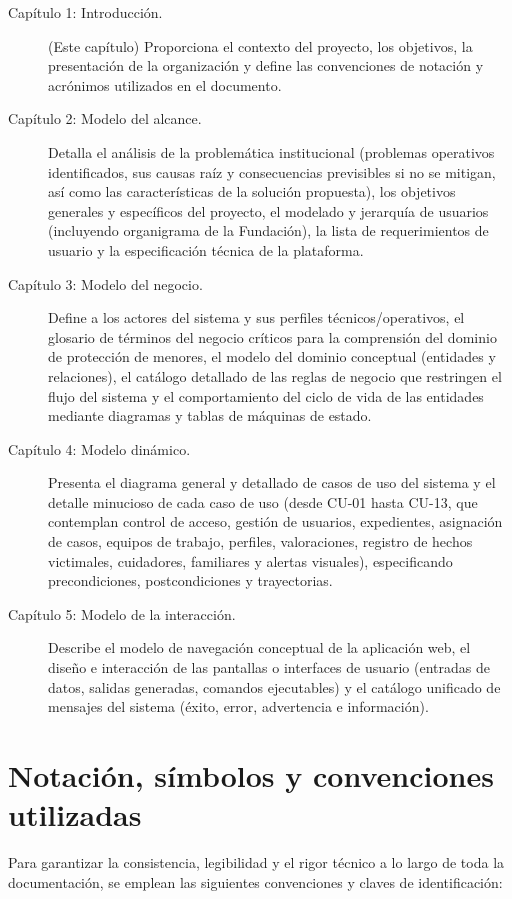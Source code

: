 \begin{description}
	\item[Capítulo 1: Introducción.] (Este capítulo) Proporciona el contexto del proyecto, los objetivos, la presentación de la organización y define las convenciones de notación y acrónimos utilizados en el documento.
	\item[Capítulo 2: Modelo del alcance.] Detalla el análisis de la problemática institucional (problemas operativos identificados, sus causas raíz y consecuencias previsibles si no se mitigan, así como las características de la solución propuesta), los objetivos generales y específicos del proyecto, el modelado y jerarquía de usuarios (incluyendo organigrama de la Fundación), la lista de requerimientos de usuario y la especificación técnica de la plataforma.
	\item[Capítulo 3: Modelo del negocio.] Define a los actores del sistema y sus perfiles técnicos/operativos, el glosario de términos del negocio críticos para la comprensión del dominio de protección de menores, el modelo del dominio conceptual (entidades y relaciones), el catálogo detallado de las reglas de negocio que restringen el flujo del sistema y el comportamiento del ciclo de vida de las entidades mediante diagramas y tablas de máquinas de estado.
	\item[Capítulo 4: Modelo dinámico.] Presenta el diagrama general y detallado de casos de uso del sistema y el detalle minucioso de cada caso de uso (desde CU-01 hasta CU-13, que contemplan control de acceso, gestión de usuarios, expedientes, asignación de casos, equipos de trabajo, perfiles, valoraciones, registro de hechos victimales, cuidadores, familiares y alertas visuales), especificando precondiciones, postcondiciones y trayectorias.
	\item[Capítulo 5: Modelo de la interacción.] Describe el modelo de navegación conceptual de la aplicación web, el diseño e interacción de las pantallas o interfaces de usuario (entradas de datos, salidas generadas, comandos ejecutables) y el catálogo unificado de mensajes del sistema (éxito, error, advertencia e información).
\end{description}

\section{Notación, símbolos y convenciones utilizadas}

Para garantizar la consistencia, legibilidad y el rigor técnico a lo largo de toda la documentación, se emplean las siguientes convenciones y claves de identificación:

